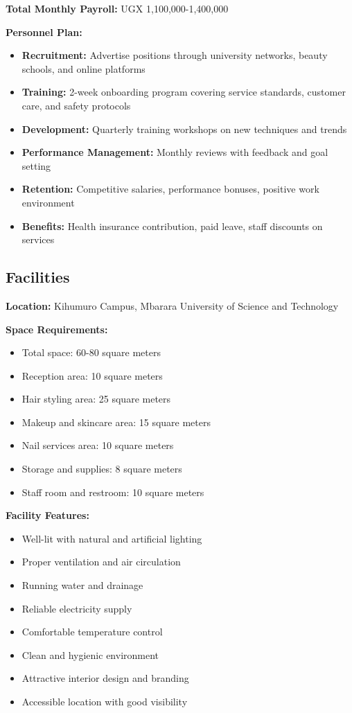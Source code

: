 \documentclass[a4paper,12pt]{article}
\begin{document}
\textbf{Total Monthly Payroll:} UGX 1,100,000-1,400,000

\textbf{Personnel Plan:}
\begin{itemize}[leftmargin=2em]
    \item \textbf{Recruitment:} Advertise positions through university networks, beauty schools, and online platforms
    \item \textbf{Training:} 2-week onboarding program covering service standards, customer care, and safety protocols
    \item \textbf{Development:} Quarterly training workshops on new techniques and trends
    \item \textbf{Performance Management:} Monthly reviews with feedback and goal setting
    \item \textbf{Retention:} Competitive salaries, performance bonuses, positive work environment
    \item \textbf{Benefits:} Health insurance contribution, paid leave, staff discounts on services
\end{itemize}

\subsection{Facilities}

\textbf{Location:} Kihumuro Campus, Mbarara University of Science and Technology

\textbf{Space Requirements:}
\begin{itemize}[leftmargin=2em]
    \item Total space: 60-80 square meters
    \item Reception area: 10 square meters
    \item Hair styling area: 25 square meters
    \item Makeup and skincare area: 15 square meters
    \item Nail services area: 10 square meters
    \item Storage and supplies: 8 square meters
    \item Staff room and restroom: 10 square meters
\end{itemize}

\textbf{Facility Features:}
\begin{itemize}[leftmargin=2em]
    \item Well-lit with natural and artificial lighting
    \item Proper ventilation and air circulation
    \item Running water and drainage
    \item Reliable electricity supply
    \item Comfortable temperature control
    \item Clean and hygienic environment
    \item Attractive interior design and branding
    \item Accessible location with good visibility
\end{itemize}
\end{document}
